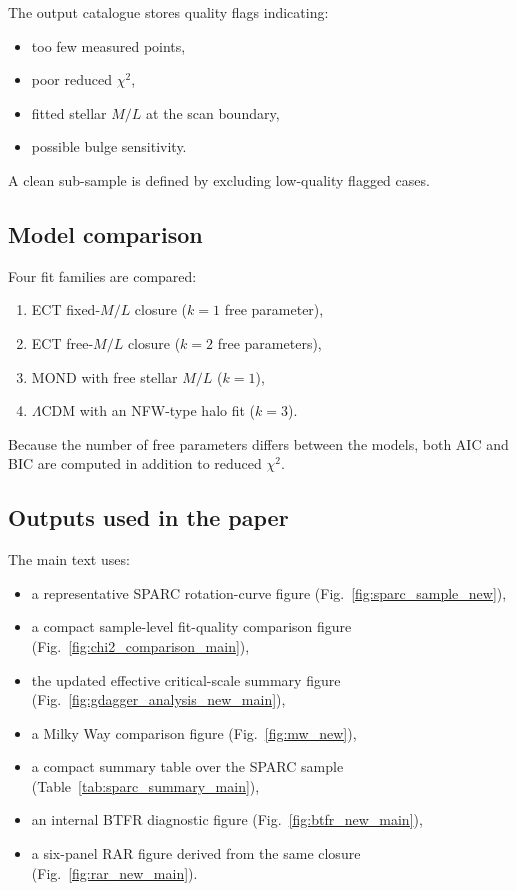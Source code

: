 \documentclass[11pt,a4paper]{article}
\numberwithin{equation}{section}
\begin{document}
The output catalogue stores quality flags indicating:
\begin{itemize}
\item too few measured points,
\item poor reduced $\chi^2$,
\item fitted stellar $M/L$ at the scan boundary,
\item possible bulge sensitivity.
\end{itemize}
A clean sub-sample is defined by excluding low-quality flagged cases.

\subsection{Model comparison}

Four fit families are compared:
\begin{enumerate}
\item ECT fixed-$M/L$ closure ($k=1$ free parameter),
\item ECT free-$M/L$ closure ($k=2$ free parameters),
\item MOND with free stellar $M/L$ ($k=1$),
\item $\Lambda$CDM with an NFW-type halo fit ($k=3$).
\end{enumerate}
Because the number of free parameters differs between the models, both
AIC and BIC are computed in addition to reduced $\chi^2$.

\subsection{Outputs used in the paper}

The main text uses:
\begin{itemize}
\item a representative SPARC rotation-curve figure (Fig.~\ref{fig:sparc_sample_new}),
\item a compact sample-level fit-quality comparison figure (Fig.~\ref{fig:chi2_comparison_main}),
\item the updated effective critical-scale summary figure (Fig.~\ref{fig:gdagger_analysis_new_main}),
\item a Milky Way comparison figure (Fig.~\ref{fig:mw_new}),
\item a compact summary table over the SPARC sample (Table~\ref{tab:sparc_summary_main}),
\item an internal BTFR diagnostic figure (Fig.~\ref{fig:btfr_new_main}),
\item a six-panel RAR figure derived from the same closure (Fig.~\ref{fig:rar_new_main}).
\end{itemize}
\end{document}
